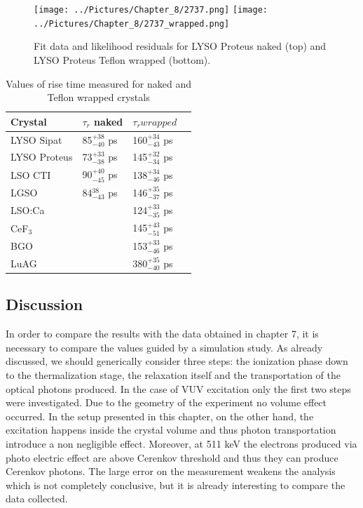 \begin{figure}[htbp]
\begin{center}
\texttt{[image: ../Pictures/Chapter\_8/2737.png]}
\texttt{[image: ../Pictures/Chapter\_8/2737\_wrapped.png]}
\end{center}
\caption[LYSO Sipat and Proteus profile]{Fit data and likelihood residuals for LYSO Proteus naked (top) and LYSO Proteus Teflon wrapped (bottom).}
\label{fig:wnw_proteus}
\end{figure}

\begin{table}[h]
\begin{center}
\begin{tabular}{|l|l|l|l|}
\hline
Crystal  & $\tau _{r}$ naked & $\tau _{r} wrapped$ \\
\hline
LYSO Sipat & 85$_{-40}^{+38}$ ps & 160$_{-43}^{+34}$ ps \\
\hline
LYSO Proteus & 73$_{-38}^{+33}$ ps & 145$_{-34}^{+32}$ ps \\ 
\hline
LSO CTI & 90$_{-45}^{+40}$ ps & 138$_{-46}^{+34}$ ps \\ 
\hline
LGSO & 84$_{-43}^{38}$ ps & 146$_{-37}^{+35}$ ps \\  
\hline
LSO:Ca &  & 124$_{-35}^{+33}$ ps \\ 
\hline
CeF$_{3}$ &  & 145$_{-51}^{+43}$ ps  \\
\hline
BGO & & 153$_{-46}^{+33}$ ps \\
\hline
LuAG & & $380_{-40}^{+35}$ ps \\
\hline
\end{tabular}
\end{center}
\caption[Rise time values for $\gamma$ bench]{Values of rise time measured for naked and Teflon wrapped crystals}
\label{table:table_gamma}
\end{table}

\subsection{Discussion}
In order to compare the results with the data obtained in chapter 7, it is necessary to compare the values guided by a simulation study.
As already discussed, we should generically consider three steps: the ionization phase down to the thermalization stage, the relaxation itself and the transportation of the optical photons produced.
In the case of VUV excitation only the first two steps were investigated. Due to the geometry of the experiment no volume effect occurred. 
In the setup presented in this chapter, on the other hand, the excitation happens inside the crystal volume and thus photon transportation introduce a non negligible effect.
Moreover, at 511 keV the electrons produced via photo electric effect are above Cerenkov threshold and thus they can produce Cerenkov photons.
The large error on the measurement weakens the analysis which is not completely conclusive, but it is already interesting to compare the data collected.

